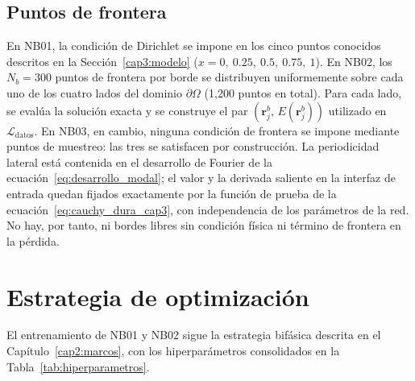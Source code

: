 \subsection{Puntos de frontera}

En NB01, la condición de Dirichlet se impone en los cinco puntos conocidos
descritos en la Sección~\ref{cap3:modelo} ($x = 0,\ 0.25,\ 0.5,\ 0.75,\ 1$).
En NB02, los $N_b = 300$ puntos de frontera por borde se distribuyen
uniformemente sobre cada uno de los cuatro lados del dominio $\partial\Omega$
(1{,}200 puntos en total). Para cada lado, se evalúa la solución exacta y se
construye el par $(\mathbf{r}^b_j,\, E(\mathbf{r}^b_j))$ utilizado en
$\mathcal{L}_\text{datos}$. En NB03, en cambio, ninguna condición de frontera
se impone mediante puntos de muestreo: las tres se satisfacen por
construcción. La periodicidad lateral está contenida en el desarrollo de
Fourier de la ecuación~\eqref{eq:desarrollo_modal}; el valor y la derivada
saliente en la interfaz de entrada quedan fijados exactamente por la función
de prueba de la ecuación~\eqref{eq:cauchy_dura_cap3}, con independencia de los
parámetros de la red. No hay, por tanto, ni bordes libres sin condición física
ni término de frontera en la pérdida.

\section{Estrategia de optimización}

El entrenamiento de NB01 y NB02 sigue la estrategia bifásica descrita en el
Capítulo~\ref{cap2:marcos}, con los hiperparámetros consolidados en la
Tabla~\ref{tab:hiperparametros}.

